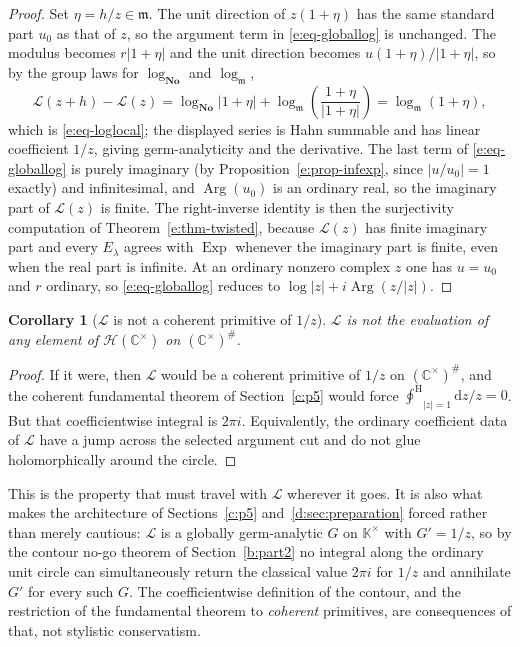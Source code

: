 \documentclass[11pt,a4paper]{article}
\numberwithin{equation}{section}
\newtheorem{corollary}[theorem]{Corollary}
\theoremstyle{definition}
\theoremstyle{remark}
\theoremstyle{plain}
\newcommand{\K}{\mathbb K}
\newcommand{\No}{\mathbf{No}}
\newcommand{\CC}{\mathbb C}
\newcommand{\mm}{\mathfrak m}
\DeclareMathOperator{\Arg}{Arg}
\DeclareMathOperator{\Exp}{Exp}
\newcommand{\halo}[1]{#1^{\#}}
\newcommand{\Hc}{\mathcal H}
\newcommand{\ointH}{{\oint^{\mathrm H}}}
\newcommand{\abs}[1]{\lvert #1\rvert}
\newcommand{\dd}{\mathrm d}
\begin{document}
\begin{proof}
Set $\eta=h/z\in\mm$.  The unit direction of $z(1+\eta)$ has the same
standard part $u_0$ as that of $z$, so the argument term in
\eqref{e:eq-globallog} is unchanged.  The modulus becomes $r\abs{1+\eta}$
and the unit direction becomes $u(1+\eta)/\abs{1+\eta}$, so by the group
laws for $\log_{\No}$ and $\log_{\mm}$,
\[
 \mathcal L(z+h)-\mathcal L(z)
 =\log_{\No}\abs{1+\eta}
  +\log_{\mm}\!\left(\frac{1+\eta}{\abs{1+\eta}}\right)
 =\log_{\mm}(1+\eta),
\]
which is \eqref{e:eq-loglocal}; the displayed series is Hahn summable and
has linear coefficient $1/z$, giving germ-analyticity and the derivative.
The last term of \eqref{e:eq-globallog} is purely imaginary (by
Proposition~\ref{e:prop-infexp}, since $\abs{u/u_0}=1$ exactly) and infinitesimal, and $\Arg(u_0)$ is an ordinary real, so
the imaginary part of $\mathcal L(z)$ is finite.  The right-inverse
identity is then the surjectivity computation of
Theorem~\ref{e:thm-twisted}, because $\mathcal L(z)$ has finite imaginary
part and every $E_\lambda$ agrees with $\Exp$ whenever the imaginary part
is finite, even when the real part is infinite.  At an
ordinary nonzero complex $z$ one has $u=u_0$ and $r$ ordinary, so
\eqref{e:eq-globallog} reduces to $\log\abs z+i\Arg(z/\abs z)$.
\end{proof}

\begin{corollary}[$\mathcal L$ is not a coherent primitive of $1/z$]
\label{e:cor-lognotcoherent}
$\mathcal L$ is not the evaluation of any element of
$\Hc(\CC^{\times})$ on $\halo{(\CC^{\times})}$.
\end{corollary}

\begin{proof}
If it were, then $\mathcal L$ would be a coherent primitive of $1/z$ on
$\halo{(\CC^{\times})}$, and the coherent fundamental theorem of Section~\ref{c:p5}
would force
$\ointH_{\abs z=1}\dd z/z=0$.  But that coefficientwise integral is
$2\pi i$.  Equivalently, the ordinary coefficient data of $\mathcal L$
have a jump across the selected argument cut and do not glue
holomorphically around the circle.
\end{proof}

This is the property that must travel with $\mathcal L$ wherever it goes.
It is also what makes the architecture of Sections~\ref{c:p5} and~\ref{d:sec:preparation} forced rather than
merely cautious: $\mathcal L$ is a globally germ-analytic $G$ on
$\K^{\times}$ with $G'=1/z$, so by the contour no-go theorem of Section~\ref{b:part2} no
integral along the ordinary unit circle can simultaneously return the
classical value $2\pi i$ for $1/z$ and annihilate $G'$ for every such $G$.
The coefficientwise definition of the contour, and the restriction of the
fundamental theorem to \emph{coherent} primitives, are consequences of
that, not stylistic conservatism.
\end{document}
